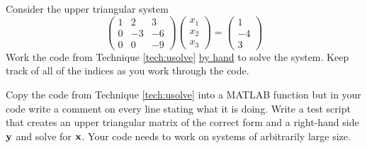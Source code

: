 \begin{problem}
    Consider the upper triangular system
    \[ \begin{pmatrix} 1 & 2 & 3 \\ 0 & -3 & -6 \\ 0 & 0 & -9 \end{pmatrix}
        \begin{pmatrix} x_1 \\ x_2 \\ x_3 \end{pmatrix} = \begin{pmatrix} 1 \\ -4 \\
        3\end{pmatrix} \]
    Work the code from Technique \ref{tech:usolve} \underline{by hand} to solve the
    system.  Keep track of all of the indices as you work through the code.
\end{problem}

\begin{problem}
    Copy the code from Technique \ref{tech:usolve} into a MATLAB function but in your code
    write a comment on every line stating what it is doing.  Write a test script that
    creates an upper triangular matrix of the correct form and a right-hand side ${\bf y}$ and
    solve for ${\bf x}$.  Your code needs to work on systems of arbitrarily large size.
\end{problem}

